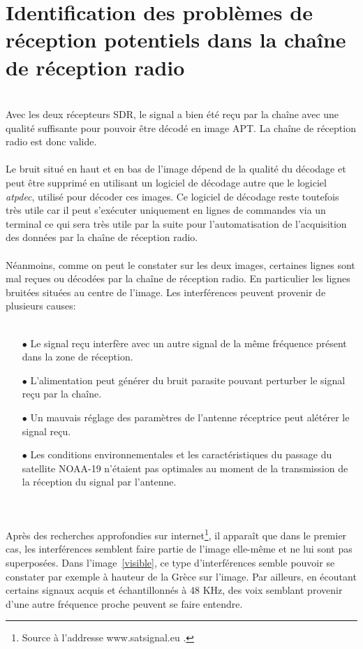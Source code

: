 \documentclass[12pt,fleqn]{book} %
\begin{document}
\section{Identification des problèmes de réception potentiels dans la chaîne de réception radio}
~\\\indent Avec les deux récepteurs SDR, le signal a bien été reçu par la chaîne avec une qualité suffisante pour pouvoir être décodé en image APT. La chaîne de réception radio est donc valide.
~\\\\Le bruit situé en haut et en bas de l'image dépend de la qualité du décodage et peut être supprimé en utilisant un logiciel de décodage autre que le logiciel \emph{atpdec}, utilisé pour décoder ces images. Ce logiciel de décodage reste toutefois très utile car il peut s'exécuter uniquement en lignes de commandes via un terminal ce qui sera très utile par la suite pour l'automatisation de l'acquisition des données par la chaîne de réception radio.
~\\\\Néanmoins, comme on peut le constater sur les deux images, certaines lignes sont mal reçues ou décodées par la chaîne de réception radio. En particulier les lignes bruitées situées au centre de l'image. Les interférences peuvent provenir de plusieurs causes:
~\\\\
\begin{itemize}
 \item[$\bullet$] Le signal reçu interfère avec un autre signal de la même fréquence présent dans la zone de réception.
 \item[$\bullet$] L'alimentation peut générer du bruit parasite pouvant perturber le signal reçu par la chaîne.
 \item[$\bullet$] Un mauvais réglage des paramètres de l'antenne réceptrice peut alétérer le signal reçu.
 \item[$\bullet$] Les conditions environnementales et les caractéristiques du passage du satellite NOAA-19 n'étaient pas optimales au moment de la transmission de la réception du signal par l'antenne.
\end{itemize}
~\\\\
Après des recherches approfondies sur internet\footnote{Source à l'addresse www.satsignal.eu .}, il apparaît que dans le premier cas, les interférences semblent faire partie de l'image elle-même et ne lui sont pas superposées. Dans l'image~\underline{\color{blue}\ref{visible}}, ce type d'interférences semble pouvoir se constater par exemple à hauteur de la Grèce sur l'image. Par ailleurs, en écoutant certains signaux acquis et échantillonnés à 48 KHz, des voix semblant provenir d'une autre fréquence proche peuvent se faire entendre.
\end{document}
